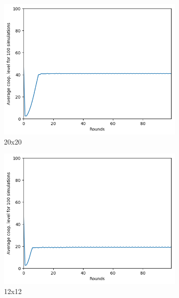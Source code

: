 \documentclass[letterpaper]{article}
\begin{document}
\begin{figure}[H]
    \begin{subfigure}{.5\textwidth}
        \centering
        \includegraphics[width=1\linewidth]{images/assign2/20-part1}
        \caption{20x20}
        \label{fig:20moorepart1}
    \end{subfigure}
    \begin{subfigure}{.5\textwidth}
        \centering
        \includegraphics[width=1\linewidth]{images/assign2/12-part1}
        \caption{12x12}
        \label{fig:12moorepart1}
    \end{subfigure}
    \begin{subfigure}{.5\textwidth}

\end{subfigure}
\end{figure}
\end{document}
